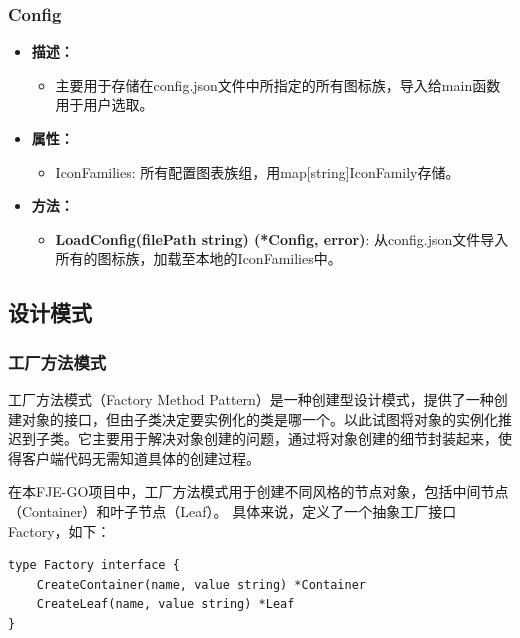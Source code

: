 \documentclass[hyperref,a4paper,UTF8]{ctexart}
\begin{document}
\subsubsection{Config}
\begin{itemize}
    \item \textbf{描述：}
    \begin{itemize}
        \item 主要用于存储在config.json文件中所指定的所有图标族，导入给main函数用于用户选取。
    \end{itemize}
    \item \textbf{属性：}
    \begin{itemize}
        \item IconFamilies: 所有配置图表族组，用map[string]IconFamily存储。
    \end{itemize}
    \item \textbf{方法：}
    \begin{itemize}
        \item \textbf{LoadConfig(filePath string) (*Config, error)}: 从config.json文件导入所有的图标族，加载至本地的IconFamilies中。
    \end{itemize}
\end{itemize}















\subsection{设计模式}
\subsubsection{工厂方法模式}
工厂方法模式（Factory Method Pattern）是一种创建型设计模式，提供了一种创建对象的接口，但由子类决定要实例化的类是哪一个。以此试图将对象的实例化推迟到子类。它主要用于解决对象创建的问题，通过将对象创建的细节封装起来，使得客户端代码无需知道具体的创建过程。

在本FJE-GO项目中，工厂方法模式用于创建不同风格的节点对象，包括中间节点（Container）和叶子节点（Leaf）。
具体来说，定义了一个抽象工厂接口 Factory，如下：
\begin{lstlisting}
type Factory interface {
    CreateContainer(name, value string) *Container
    CreateLeaf(name, value string) *Leaf
}
\end{lstlisting}
\end{document}
